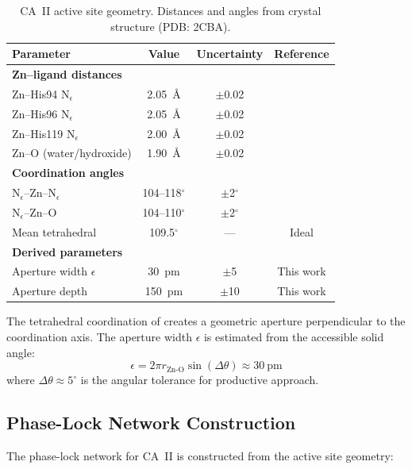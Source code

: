 \documentclass[twocolumn,amsmath,amssymb,aps,prb,superscriptaddress,longbibliography]{revtex4-2}
\begin{document}
\begin{table}[h]
\centering
\caption{CA~II active site geometry. Distances and angles from crystal structure (PDB: 2CBA).}
\label{tab:geometry-full}
\begin{tabular}{lccc}
\toprule
Parameter & Value & Uncertainty & Reference \\
\midrule
\multicolumn{4}{l}{\textbf{Zn--ligand distances}} \\
Zn--His94 N$_\epsilon$ & 2.05~\AA & $\pm$0.02 & \cite{Hakansson1992} \\
Zn--His96 N$_\epsilon$ & 2.05~\AA & $\pm$0.02 & \cite{Hakansson1992} \\
Zn--His119 N$_\epsilon$ & 2.00~\AA & $\pm$0.02 & \cite{Hakansson1992} \\
Zn--O (water/hydroxide) & 1.90~\AA & $\pm$0.02 & \cite{Hakansson1992} \\
\midrule
\multicolumn{4}{l}{\textbf{Coordination angles}} \\
N$_\epsilon$--Zn--N$_\epsilon$ & 104--118$^\circ$ & $\pm$2$^\circ$ & \cite{Hakansson1992} \\
N$_\epsilon$--Zn--O & 104--110$^\circ$ & $\pm$2$^\circ$ & \cite{Hakansson1992} \\
Mean tetrahedral & 109.5$^\circ$ & --- & Ideal \\
\midrule
\multicolumn{4}{l}{\textbf{Derived parameters}} \\
Aperture width $\epsilon$ & 30~pm & $\pm$5 & This work \\
Aperture depth & 150~pm & $\pm$10 & This work \\
\bottomrule
\end{tabular}
\end{table}

The tetrahedral coordination of  creates a geometric aperture perpendicular to the coordination axis. The aperture width $\epsilon$ is estimated from the accessible solid angle:
\begin{equation}
\epsilon = 2\pi r_{\text{Zn-O}} \sin(\Delta\theta) \approx 30~\text{pm}
\end{equation}
where $\Delta\theta \approx 5^\circ$ is the angular tolerance for productive  approach.

\subsection{Phase-Lock Network Construction}

The phase-lock network for CA~II is constructed from the active site geometry:
\end{document}

